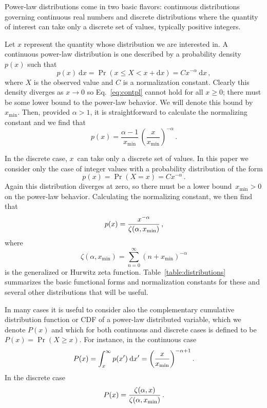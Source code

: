 \documentclass[final]{siamltex}
\renewcommand{\d}{\mathrm{d}}
\newcommand{\xmin}{\ensuremath{x_{\min}}}
\newcommand{\punctspace}{\,}
\begin{document}
Power-law distributions come in two basic flavors: continuous distributions
governing continuous real numbers and discrete distributions where the
quantity of interest can take only a discrete set of values, typically
positive integers.

Let $x$ represent the quantity whose distribution we are interested in.  A
continuous power-law distribution is one described by a probability
density~$p(x)$ such that
\begin{equation}
 p(x)\>\d x = \Pr(x \le X < x+\d x)
            = Cx^{-\alpha}\>\d x\punctspace,
\label{eq:contpl}
\end{equation}
where $X$ is the observed value and $C$ is a normalization constant.
Clearly this density diverges as $x\to0$ so Eq.~\eqref{eq:contpl} cannot
hold for all $x\ge0$; there must be some lower bound to the power-law
behavior.  We will denote this bound by $\xmin$.  Then, provided
$\alpha>1$, it is straightforward to calculate the normalizing constant and
we find that
\begin{equation}
\label{eq:full:continuous}
p(x) = \frac{\alpha-1}{\xmin}\,
 \left( \frac{x}{\xmin} \right)^{-\alpha}\punctspace.
\end{equation}

In the discrete case, $x$~can take only a discrete set of values.  In this
paper we consider only the case of integer values with a probability
distribution of the form
\begin{equation}
p(x) = \Pr(X=x) = Cx^{-\alpha}\punctspace.
\end{equation}
Again this distribution diverges at zero, so there must be a lower
bound~$\xmin>0$ on the power-law behavior.  Calculating the normalizing
constant, we then find that
\begin{equation}
\label{eq:full:discrete}
p(x) = {x^{-\alpha}\over\zeta(\alpha,\xmin)}\punctspace,
\end{equation}
where
\begin{equation}
\zeta(\alpha,\xmin) = \sum_{n=0}^\infty (n+\xmin)^{-\alpha}
\end{equation}
is the generalized or Hurwitz zeta function.
Table~\ref{table:distributions} summarizes the basic functional forms and
normalization constants for these and several other distributions that will
be useful.

In many cases it is useful to consider also the complementary cumulative
distribution function or CDF of a power-law distributed variable, which we
denote $P(x)$ and which for both continuous and discrete cases is defined
to be $P(x) = \Pr(X\ge x)$.  For instance, in the continuous case
\begin{equation}
\label{eq:cdf:continuous}
P(x) = \int_x^\infty p(x') \>\d x'
    = \biggl( {x\over x_\mathrm{min}} \biggr)^{-\alpha+1}\punctspace.
\end{equation}
In the discrete case
\begin{equation}
\label{eq:cdf:discrete}
P(x) = {\zeta(\alpha,x)\over\zeta(\alpha,\xmin)}\punctspace.
\end{equation}
\end{document}

